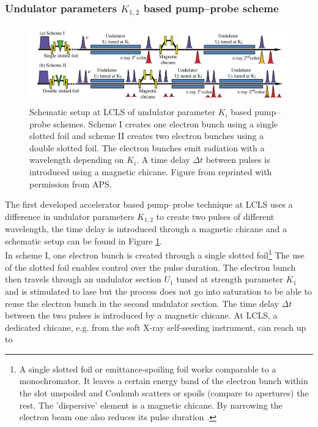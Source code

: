 \subsubsection{Undulator parameters $K_{1,2}$ based pump--probe scheme}
\begin{figure}
	\centering
		\includegraphics[width=1.00\textwidth]{images/Albertos-pump-probe-scheme.png}
	\caption{Schematic setup at LCLS of undulator parameter $K_{i}$ based pump--probe schemes. Scheme I creates one electron bunch using a single slotted foil and scheme II creates two electron bunches using a double slotted foil. The electron bunches emit radiation with a wavelength depending on $K_{i}$. A time delay $\Delta t$ between pulses is introduced using a magnetic chicane. Figure from \cite{Lutman-2013-PRL} reprinted with permission from APS.}
	\label{fig:Albertos-pump-probe-scheme}
\end{figure}
The first developed accelerator based pump--probe technique at LCLS \cite{Lutman-2013-PRL} uses a difference in undulator parameters $K_{1,2}$ to create two pulses of different wavelength, the time delay is introduced through a magnetic chicane and a schematic setup can be found in Figure \ref{fig:Albertos-pump-probe-scheme}.\\
In scheme I, one electron bunch is created through a single slotted foil\footnote{A single slotted foil or emittance-spoiling foil works comparable to a monochromator. It leaves a certain energy band of the electron bunch within the slot unspoiled and Coulomb scatters or spoils (compare to apertures) the rest. The 'dispersive' element is a magnetic chicane. By narrowing the electron beam one also reduces its pulse duration \cite{Emma-2004-PRL}.}  The use of the slotted foil enables control over the pulse duration. The electron bunch then travels through an undulator section $U_{1}$ tuned at strength parameter $K_{1}$ and is stimulated to lase but the process does not go into saturation to be able to reuse the electron bunch in the second undulator section. The time delay $\Delta t$ between the two pulses is introduced by a magnetic chicane. At LCLS, a dedicated chicane, e.g. from the soft X-ray self-seeding instrument, can reach up to
